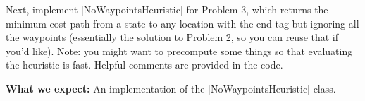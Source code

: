 \item {}

Next, implement |NoWaypointsHeuristic| for Problem 3, which returns the minimum cost path from a state to any location with the end tag but ignoring all the waypoints (essentially the solution to Problem 2, so you can reuse that if you'd like). Note: you might want to precompute some things so that evaluating the heuristic is fast. Helpful comments are provided in the code.

\textbf{What we expect: } An implementation of the |NoWaypointsHeuristic| class.
